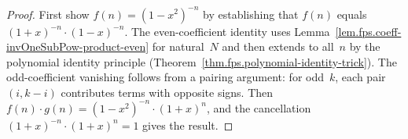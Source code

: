 \begin{proof}
First show $f(n) = (1-x^2)^{-n}$ by establishing that $f(n)$ equals
$(1+x)^{-n} \cdot (1-x)^{-n}$.
The even-coefficient identity uses Lemma~\ref{lem.fps.coeff-invOneSubPow-product-even} for natural~$N$
and then extends to all~$n$ by the polynomial identity principle
(Theorem~\ref{thm.fps.polynomial-identity-trick}).
The odd-coefficient vanishing follows from a pairing argument: for odd~$k$,
each pair $(i,k-i)$ contributes terms with opposite signs.
Then $f(n)\cdot g(n) = (1-x^2)^{-n}\cdot(1+x)^n$, and the cancellation
$(1+x)^{-n}\cdot(1+x)^n = 1$
gives the result.
\end{proof}

